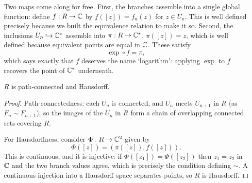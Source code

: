 \documentclass[a4paper]{scrartcl}
\newcommand{\Cs}{\C^*}
\begin{document}
\begin{center}
\end{center}

Two maps come along for free. First, the branches assemble into a single global function:
define $f : R \to \mathbb{C}$ by $f([z]) = f_n(z)$ for $z \in U_n$. This is well defined precisely
because we built the equivalence relation to make it so. Second, the inclusions
$U_n \hookrightarrow \Cs$ assemble into $\pi : R \to \Cs$, $\pi([z]) = z$, which is well
defined because equivalent points are equal in $\mathbb{C}$. These satisfy
$$
\exp \circ f = \pi,
$$
which says exactly that $f$ deserves the name `logarithm': applying $\exp$ to $f$ recovers
the point of $\Cs$ underneath.

\begin{proposition}
	$R$ is path-connected and Hausdorff.
\end{proposition}

\begin{proof}
	Path-connectedness: each $U_n$ is connected, and $U_n$ meets $U_{n+1}$ in $R$ (as
	$F_n \sim F_{n+1}$), so the images of the $U_n$ in $R$ form a chain of overlapping
	connected sets covering $R$.

	For Hausdorffness, consider $\Phi : R \to \mathbb{C}^2$ given by
	$$
	\Phi([z]) = (\pi([z]), f([z])).
	$$
	This is continuous, and it is injective: if $\Phi([z_1]) = \Phi([z_2])$ then $z_1 = z_2$
	in $\mathbb{C}$ and the two branch values agree, which is precisely the condition defining
	$\sim$. A continuous injection into a Hausdorff space separates points, so $R$ is
	Hausdorff.
\end{proof}
\end{document}
